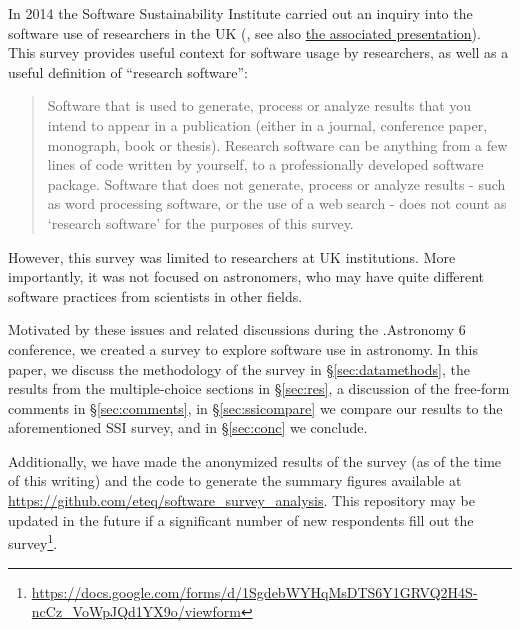 In 2014 the Software Sustainability Institute carried out an inquiry into the software use of researchers in the UK  (\cite{f824cd98-b953-4c08-96c8-2533188bc4c4}, see also \href{http://wl.figshare.com/articles/1243288/embed?show_title=1}{the associated presentation}). This survey provides useful context for software usage by researchers, as well as a useful definition of ``research software'':
\begin{quote}
Software that is used to generate, process or analyze results that you intend to appear in a publication (either in a journal, conference paper, monograph, book or thesis). Research software can be anything from a few lines of code written by yourself, to a professionally developed software package. Software that does not generate, process or analyze results - such as word processing software, or the use of a web search - does not count as ‘research software’ for the purposes of this survey.
\end{quote}
However, this survey was limited to researchers at UK institutions.  More importantly, it was not focused on astronomers, who may have quite different software practices from scientists in other fields.

Motivated by these issues and related discussions during the .Astronomy 6 conference, we created a survey to explore software use in astronomy.  In this paper, we discuss the methodology of the survey in \S \ref{sec:datamethods}, the results from the multiple-choice sections in \S \ref{sec:res}, a discussion of the free-form comments in \S \ref{sec:comments}, in \S \ref{sec:ssicompare} we compare our results to the aforementioned SSI survey, and in \S \ref{sec:conc} we conclude.

Additionally, we have made the anonymized results of the survey (as of the time of this writing) and the code to generate the summary figures available at \url{https://github.com/eteq/software_survey_analysis}. This repository may be updated in the future if a significant number of new respondents fill out the survey\footnote{\url{https://docs.google.com/forms/d/1SgdebWYHqMsDTS6Y1GRVQ2H4S-ncCz_VoWpJQd1YX9o/viewform}}.
    
  
  
  
  
  